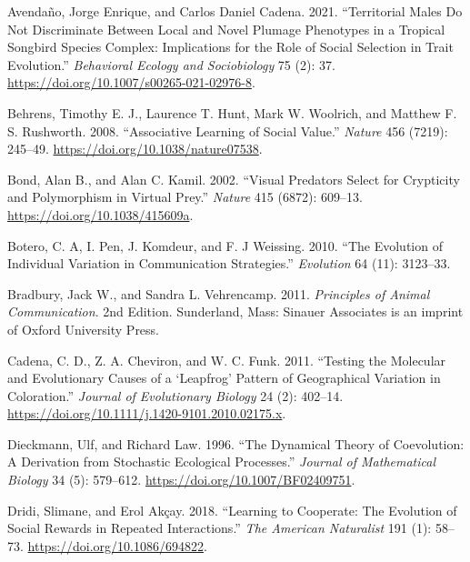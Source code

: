 \documentclass[
  12pt,
]{article}
\newlength{\cslhangindent}
\newlength{\cslentryspacingunit} %
\newenvironment{CSLReferences}[2] %
 {%
  \setlength{\parindent}{0pt}
  \ifodd #1
  \let\oldpar\par
  \def\par{\hangindent=\cslhangindent\oldpar}
  \fi
  \setlength{\parskip}{#2\cslentryspacingunit}
 }%
 {}
\begin{document}
\hypertarget{refs}{}
\begin{CSLReferences}{1}{0}
\leavevmode{}%
Avendaño, Jorge Enrique, and Carlos Daniel Cadena. 2021. {``Territorial
Males Do Not Discriminate Between Local and Novel Plumage Phenotypes in
a Tropical Songbird Species Complex: Implications for the Role of Social
Selection in Trait Evolution.''} \emph{Behavioral Ecology and
Sociobiology} 75 (2): 37.
\url{https://doi.org/10.1007/s00265-021-02976-8}.

\leavevmode{}%
Behrens, Timothy E. J., Laurence T. Hunt, Mark W. Woolrich, and Matthew
F. S. Rushworth. 2008. {``Associative Learning of Social Value.''}
\emph{Nature} 456 (7219): 245--49.
\url{https://doi.org/10.1038/nature07538}.

\leavevmode{}%
Bond, Alan B., and Alan C. Kamil. 2002. {``Visual Predators Select for
Crypticity and Polymorphism in Virtual Prey.''} \emph{Nature} 415
(6872): 609--13. \url{https://doi.org/10.1038/415609a}.

\leavevmode{}%
Botero, C. A, I. Pen, J. Komdeur, and F. J Weissing. 2010. {``The
Evolution of Individual Variation in Communication Strategies.''}
\emph{Evolution} 64 (11): 3123--33.

\leavevmode{}%
Bradbury, Jack W., and Sandra L. Vehrencamp. 2011. \emph{Principles of
{Animal} {Communication}}. 2nd Edition. Sunderland, Mass: Sinauer
Associates is an imprint of Oxford University Press.

\leavevmode{}%
Cadena, C. D., Z. A. Cheviron, and W. C. Funk. 2011. {``Testing the
Molecular and Evolutionary Causes of a {`Leapfrog'} Pattern of
Geographical Variation in Coloration.''} \emph{Journal of Evolutionary
Biology} 24 (2): 402--14.
\url{https://doi.org/10.1111/j.1420-9101.2010.02175.x}.

\leavevmode{}%
Dieckmann, Ulf, and Richard Law. 1996. {``The Dynamical Theory of
Coevolution: A Derivation from Stochastic Ecological Processes.''}
\emph{Journal of Mathematical Biology} 34 (5): 579--612.
\url{https://doi.org/10.1007/BF02409751}.

\leavevmode{}%
Dridi, Slimane, and Erol Akçay. 2018. {``Learning to {Cooperate}: {The}
{Evolution} of {Social} {Rewards} in {Repeated} {Interactions}.''}
\emph{The American Naturalist} 191 (1): 58--73.
\url{https://doi.org/10.1086/694822}.


\end{CSLReferences}
\end{document}
